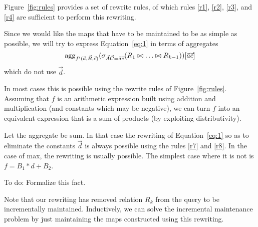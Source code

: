 Figure~\ref{fig:rules} provides a set of rewrite rules, of which rules
\ref{r1}, \ref{r2}, \ref{r3}, and \ref{r4} are sufficient to  perform this
rewriting.

Since we would like the maps that have to be maintained to be as simple as
possible, we will try to express Equation~\ref{eq:1} in terms of 
aggregates
\begin{equation}
\mathrm{agg}_{f'(\vec{a}, \vec{B}, \vec{c})}
(\sigma_{\vec{A}\vec{C}=\vec{a}\vec{c}}(R_1 \bowtie \dots \bowtie R_{k-1}))[\vec{a}\vec{c}]
\label{eq:2}
\end{equation}
which do not use $\vec{d}$.

In most cases
this is possible using the rewrite rules of Figure~\ref{fig:rules}.
Assuming that $f$ is an arithmetic expression built using addition and multiplication (and constants which may be negative), we can turn $f$ into an equivalent
expression that is a sum of products (by exploiting distributivity).

Let the aggregate be sum. In that case the rewriting of Equation~\ref{eq:1}
so as to eliminate the constants $\vec{d}$
is always possible using the rules \ref{r7} and \ref{r8}.
In the case of max, the rewriting is usually possible. The simplest case
where it is not is $f = B_1 * d + B_2$.


\begin{proposition}
To do: Formalize this fact.
\end{proposition}


Note that our rewriting has removed relation $R_k$ from the query to be
incrementally maintained. Inductively, we can solve the incremental maintenance
problem by just maintaining the maps constructed using this rewriting.


